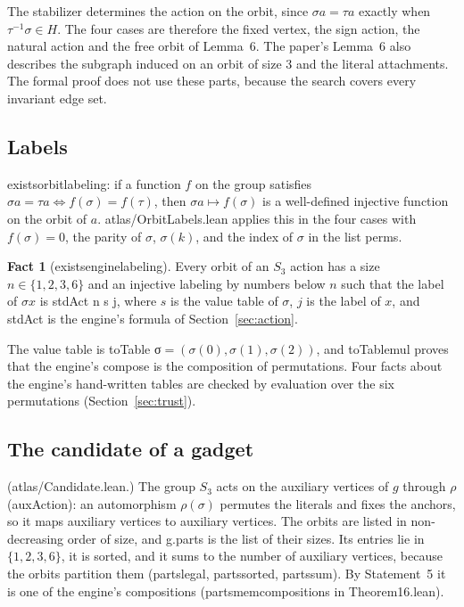 \documentclass[11pt,a4paper]{article}
\newcommand{\leanus}{\textunderscore\allowbreak}
\newcommand{\lean}[1]{{\ttfamily\let\_\leanus #1}}
\theoremstyle{definition}
\newtheorem{fact}{Fact}
\begin{document}
The stabilizer determines the action on the orbit, since $\sigma a=\tau a$
exactly when $\tau^{-1}\sigma\in H$. The four cases are therefore the fixed
vertex, the sign action, the natural action and the free orbit of Lemma~6.
The paper's Lemma~6 also describes the subgraph induced on an orbit of size 3
and the literal attachments. The formal proof does not use these parts,
because the search covers every invariant edge set.

\subsection{Labels}\label{sec:labels}
\lean{exists\_orbit\_labeling}: if a function $f$ on the group satisfies
$\sigma a=\tau a \iff f(\sigma)=f(\tau)$, then $\sigma a\mapsto f(\sigma)$ is
a well-defined injective function on the orbit of $a$.
\lean{atlas/OrbitLabels.lean} applies this in the four cases with
$f(\sigma)=0$, the parity of $\sigma$, $\sigma(k)$, and the index of $\sigma$
in the list \lean{perms}.

\begin{fact}[\lean{exists\_engine\_labeling}]
Every orbit of an $S_3$ action has a size $n\in\{1,2,3,6\}$ and an injective
labeling by numbers below $n$ such that the label of $\sigma x$ is
\lean{stdAct n s j}, where $s$ is the value table of $\sigma$, $j$ is the
label of $x$, and \lean{stdAct} is the engine's formula of
Section~\ref{sec:action}.
\end{fact}

The value table is \lean{toTable σ}${}=(\sigma(0),\sigma(1),\sigma(2))$, and
\lean{toTable\_mul} proves that the engine's \lean{compose} is the composition
of permutations. Four facts about the engine's hand-written tables are checked
by evaluation over the six permutations (Section~\ref{sec:trust}).

\subsection{The candidate of a gadget}
(\lean{atlas/Candidate.lean}.) The group $S_3$ acts on the auxiliary vertices
of $g$ through $\rho$ (\lean{auxAction}): an automorphism $\rho(\sigma)$
permutes the literals and fixes the anchors, so it maps auxiliary vertices to
auxiliary vertices. The orbits are listed in non-decreasing order of size,
and \lean{g.parts} is the list of their sizes. Its entries lie in
$\{1,2,3,6\}$, it is sorted, and it sums to the number of auxiliary vertices,
because the orbits partition them (\lean{parts\_legal}, \lean{parts\_sorted},
\lean{parts\_sum}). By Statement~5 it is one of the engine's compositions
(\lean{parts\_mem\_compositions} in \lean{Theorem16.lean}).
\end{document}
